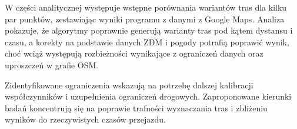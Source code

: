 \documentclass[12pt]{article}
\begin{document}
W części analitycznej występuje wstępne porównania wariantów tras dla kilku par punktów,
zestawiając wyniki programu z danymi z Google Maps. Analiza pokazuje, że algorytmy poprawnie
generują warianty tras pod kątem dystansu i czasu, a korekty na podstawie danych ZDM i pogody
potrafią poprawić wynik, choć wciąż występują rozbieżności wynikające z ograniczeń danych
oraz uproszczeń w grafie OSM.

Zidentyfikowane ograniczenia wskazują na potrzebę dalszej kalibracji współczynników i
uzupełnienia ograniczeń drogowych. Zaproponowane kierunki badań
koncentrują się na poprawie trafności wyznaczania tras i zbliżeniu wyników do rzeczywistych
czasów przejazdu.
\end{document}
